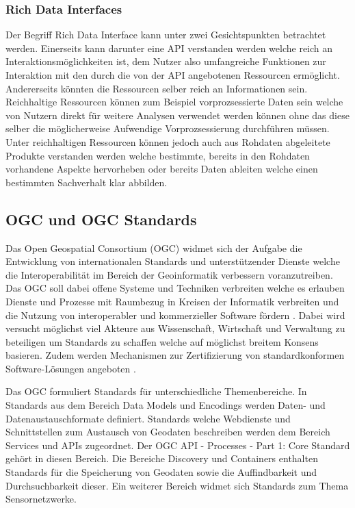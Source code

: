 \subsubsection{Rich Data Interfaces}
Der Begriff Rich Data Interface kann unter zwei Gesichtspunkten betrachtet werden. Einerseits kann darunter eine API verstanden werden welche 
reich an Interaktionsmöglichkeiten ist, dem Nutzer also umfangreiche Funktionen zur Interaktion mit den durch die von der API angebotenen Ressourcen ermöglicht.
Andererseits könnten die Ressourcen selber reich an Informationen sein. Reichhaltige Ressourcen können zum Beispiel vorprozsessierte Daten 
sein welche von Nutzern direkt für weitere Analysen verwendet werden können ohne das diese selber die möglicherweise Aufwendige Vorprozsessierung durchführen müssen.\\ 
Unter reichhaltigen Ressourcen können jedoch auch aus Rohdaten abgeleitete Produkte verstanden werden welche bestimmte, bereits in den Rohdaten vorhandene Aspekte 
hervorheben oder bereits Daten ableiten welche einen bestimmten Sachverhalt klar abbilden. 

\subsection{OGC und OGC Standards}
Das Open Geospatial Consortium (OGC) widmet sich der Aufgabe die Entwicklung von internationalen Standards und unterstützender Dienste welche die Interoperabilität im 
Bereich der Geoinformatik verbessern voranzutreiben. Das OGC soll dabei offene Systeme und Techniken verbreiten welche es erlauben Dienste und Prozesse mit Raumbezug
in Kreisen der Informatik verbreiten und die Nutzung von interoperabler und kommerzieller Software fördern \cite{ogc_bylaws}. Dabei wird versucht möglichst viel
Akteure aus Wissenschaft, Wirtschaft und Verwaltung zu beteiligen um Standards zu schaffen welche auf möglichst breitem Konsens basieren. Zudem werden 
Mechanismen zur Zertifizierung von standardkonformen Software-Lösungen angeboten \cite{ogc_bylaws}.

Das OGC formuliert Standards für unterschiedliche Themenbereiche. In Standards aus dem Bereich Data Models und Encodings werden Daten- und Datenaustauschformate
definiert. Standards welche Webdienste und Schnittstellen zum Austausch von Geodaten beschreiben werden dem Bereich Services und APIs zugeordnet. 
Der OGC API - Processes - Part 1: Core Standard gehört in diesen Bereich. Die Bereiche Discovery und Containers enthalten Standards für die Speicherung von Geodaten
sowie die Auffindbarkeit und Durchsuchbarkeit dieser. Ein weiterer Bereich widmet sich Standards zum Thema Sensornetzwerke. 

